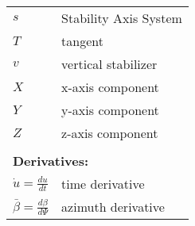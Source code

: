 \begin{longtable}[l]{ l p{} }
  $s$   & Stability Axis System \\
  $T$   & tangent \\
  $v$   & vertical stabilizer \\
  $X$   & x-axis component \\
  $Y$   & y-axis component \\
  $Z$   & z-axis component \\
  & \\
  \multicolumn{2}{l}{\textbf{Derivatives:}} \\
  $\dot u=\frac{du}{dt}$             & time derivative \\
  $\bar \beta=\frac{d\beta}{d\Psi}$  & azimuth derivative \\
\end{longtable}
